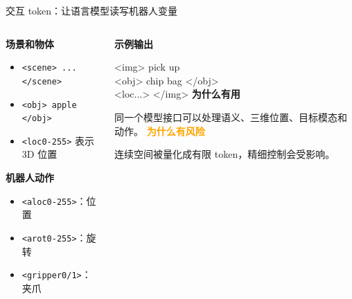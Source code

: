 \documentclass[aspectratio=169,11pt]{ctexbeamer}
\newcommand{\orangebold}[1]{\textcolor{Orange}{\textbf{#1}}}
\newcommand{\insertframesource}{}
\newcommand{\setsource}[1]{\gdef\insertframesource{#1}}
\begin{document}
\setsource{Ref.: [1] H. Zhen \emph{et al.}, ``3D-VLA: A 3D Vision-Language-Action Generative World Model,'' in \emph{Proc. ICML}, vol. 235, 2024, Sec. 4.2.2.}
\begin{frame}[fragile]{交互 token：让语言模型读写机器人变量}
\begin{columns}[T,onlytextwidth]
\begin{column}{0.46\textwidth}
\textbf{场景和物体}
\begin{itemize}\item \texttt{<scene> ... </scene>}\item \texttt{<obj> apple </obj>}\item \texttt{<loc0-255>} 表示 3D 位置\end{itemize}
\vspace{0.20cm}\textbf{机器人动作}
\begin{itemize}\item \texttt{<aloc0-255>}：位置\item \texttt{<arot0-255>}：旋转\item \texttt{<gripper0/1>}：夹爪\end{itemize}
\end{column}
\begin{column}{0.48\textwidth}
\textbf{示例输出}\par\vspace{0.10cm}
{\small\ttfamily <img> pick up\\<obj> chip bag </obj>\\<loc...> </img>}\vspace{0.42cm}
\textbf{为什么有用}\par 同一个模型接口可以处理语义、三维位置、目标模态和动作。\vspace{0.22cm}
\orangebold{为什么有风险}\par 连续空间被量化成有限 token，精细控制会受影响。
\end{column}
\end{columns}
\end{frame}
\end{document}
